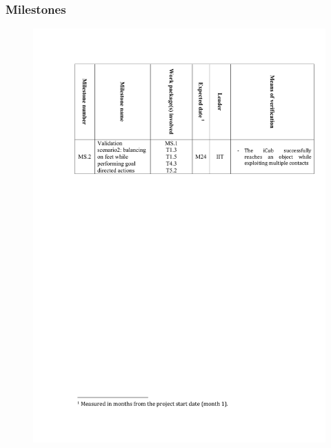 \documentclass[12pt,a4paper,twoside]{article}
\begin{document}
\subsubsection{Milestones}

\begin{figure}[ht!]
\centering
\includegraphics[width=\textwidth]{./images/milestones.pdf}
\end{figure}

\newpage


% 



\end{document}
